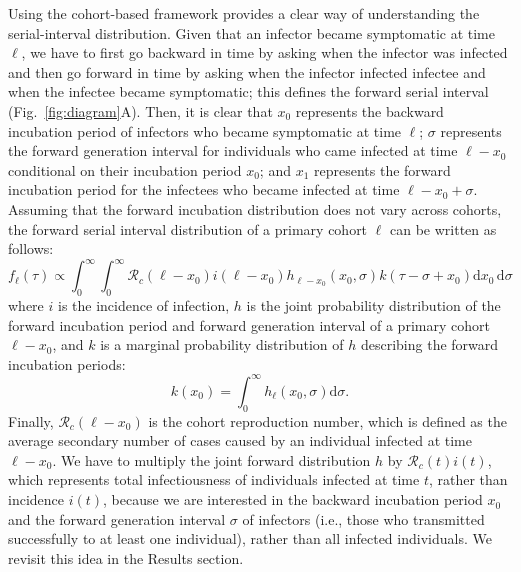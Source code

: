 \documentclass[12pt]{article}
\newcommand{\fref}[1]{Fig.~\ref{fig:#1}}
\begin{document}
Using the cohort-based framework provides a clear way of understanding the serial-interval distribution.
Given that an infector became symptomatic at time $\ell$, we have to first go backward in time by asking when the infector was infected and then go forward in time by asking when the infector infected infectee and when the infectee became symptomatic;
this defines the forward serial interval (\fref{diagram}A).
Then, it is clear that $x_0$ represents the backward incubation period of infectors who became symptomatic at time $\ell$; 
$\sigma$ represents the forward generation interval for individuals who came infected at time $\ell - x_0$ conditional on their incubation period $x_0$;
and $x_1$ represents the forward incubation period for the infectees who became infected at time $\ell - x_0 + \sigma$.
Assuming that the forward incubation distribution does not vary across cohorts, the forward serial interval distribution of a primary cohort $\ell$ can be written as follows:
\begin{equation}
f_\ell(\tau) \propto \int_{0}^\infty \int_{0}^\infty \mathcal R_c (\ell - x_0) i(\ell - x_0) h_{\ell - x_0}(x_0, \sigma) k(\tau-\sigma+x_0) \mathrm{d} x_0\, \mathrm{d}\sigma
\label{eq:forward}
\end{equation}
where $i$ is the incidence of infection, $h$ is the joint probability distribution of the forward incubation period and forward generation interval of a primary cohort $\ell - x_0$, and $k$ is a marginal probability distribution of $h$ describing the forward incubation periods:
\begin{equation}
k(x_0) = \int_0^\infty h_\ell(x_0, \sigma) \mathrm{d}\sigma.
\end{equation}
Finally, $\mathcal R_c (\ell - x_0)$ is the cohort reproduction number, which is defined as the average secondary number of cases caused by an individual infected at time $\ell - x_0$.
We have to multiply the joint forward distribution $h$ by $\mathcal R_c (t) i(t)$, which represents total infectiousness of individuals infected at time $t$, rather than incidence $i(t)$, because we are interested in the backward incubation period $x_0$ and the forward generation interval $\sigma$ of infectors (i.e., those who transmitted successfully to at least one individual), rather than all infected individuals.
We revisit this idea in the Results section.
\end{document}
